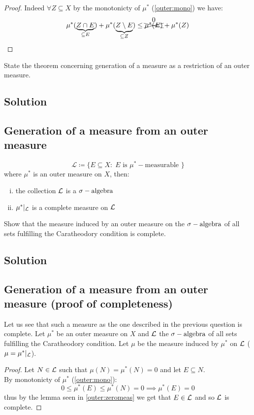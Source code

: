 \begin{proof}\label{outer:zeromeas}
    Indeed $\forall Z \subseteq X$ by the monotonicty of $\mu^*$ (\ref{outer:mono}) we have:
    \[
        \mu^*(\underbrace{Z\cap E}_{\subseteq E}) + \mu^*(\underbrace{Z\setminus E}_{\subseteq Z}) \leq \overset{\text{\normalsize0}}{\xcancel{\mu^*(E)}} + \mu^*(Z)
    \]
\end{proof}



\question
State the theorem concerning generation of a measure as a restriction of an outer measure.

\subsection*{Solution}
\subsection{Generation of a measure from an outer measure}\label{meas:gen}
\provdef[$\mathcal{L}$]
\[
    \mathcal{L} \coloneqq \{ E\subseteq X : \; E \text{ is } \mu^*-\text{measurable } \}
\]
where $\mu^*$ is an outer measure on $X$, then:
\begin{enumerate}[i)]
    \item the collection $\mathcal{L}$ is a $\sigma-\text{algebra}$
    \item $\mu^* |_{\mathcal{L}}$ is a complete measure on $\mathcal{L}$
\end{enumerate}


\question
Show that the measure induced by an outer measure on the $\sigma-\text{algebra}$ of all sets fulfilling the
Caratheodory condition is complete.

\subsection*{Solution}
\subsection{Generation of a measure from an outer measure (proof of completeness)}
Let us see that such a measure as the one described in the previous question is complete. Let $\mu^*$ be an outer measure on $X$ and $\mathcal{L}$ the $\sigma-\text{algebra}$ of all sets fulfilling the Caratheodory condition. Let $\mu$ be the measure induced by $\mu^*$ on $\mathcal{L}$ ($\mu=\mu^* |_{\mathcal{L}}$).
\begin{proof}
    Let $N\in\mathcal{L}$ such that $\mu(N)=\mu^*(N)=0$ and let $E\subseteq N$.\\
    By monotonicty of $\mu^*$ (\ref{outer:mono}):
    \[
        0\leq \mu^*(E)\leq \mu^*(N)=0 \implies \mu^*(E)=0
    \]
    thus by the lemma seen in \ref{outer:zeromeas} we get that $E\in\mathcal{L}$ and so $\mathcal{L}$ is complete.
\end{proof}


